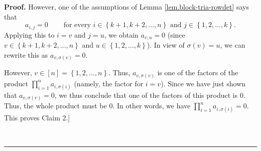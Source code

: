 \documentclass
[numbers=enddot,12pt,final,onecolumn,notitlepage,english]{scrartcl}%
\theoremstyle{definition}
\newenvironment{proof}[1][Proof]{\noindent\textbf{#1.} }{\ \rule{0.5em}{0.5em}}
\let\prodnonlimits\prod
\renewcommand{\prod}{\prodnonlimits\limits}
\newenvironment{verlong}{}{}
\begin{document}
\begin{verlong}
\begin{proof}
However, one of the assumptions of Lemma \ref{lem.block-tria-rowdet} says that%
\[
a_{i,j}=0\ \ \ \ \ \ \ \ \ \ \text{for every }i\in\left\{  k+1,k+2,\ldots
,n\right\}  \text{ and }j\in\left\{  1,2,\ldots,k\right\}  .
\]
Applying this to $i=v$ and $j=u$, we obtain $a_{v,u}=0$ (since $v\in\left\{
k+1,k+2,\ldots,n\right\}  $ and $u\in\left\{  1,2,\ldots,k\right\}  $). In
view of $\sigma\left(  v\right)  =u$, we can rewrite this as $a_{v,\sigma
\left(  v\right)  }=0$.

However, $v\in\left[  n\right]  =\left\{  1,2,\ldots,n\right\}  $. Thus,
$a_{v,\sigma\left(  v\right)  }$ is one of the factors of the product
$\prod_{i=1}^{n}a_{i,\sigma\left(  i\right)  }$ (namely, the factor for
$i=v$). Since we have just shown that $a_{v,\sigma\left(  v\right)  }=0$, we
thus conclude that one of the factors of this product is $0$. Thus, the whole
product must be $0$. In other words, we have $\prod_{i=1}^{n}a_{i,\sigma
\left(  i\right)  }=0$. This proves Claim 2.] \medskip


\end{proof}
\end{verlong}
\end{document}

